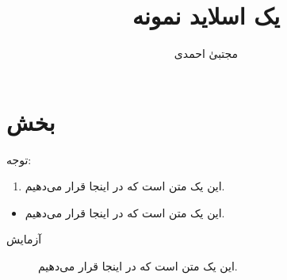 \documentclass{beamer}
\title{یک اسلاید نمونه}
\author{مجتبیٰ احمدی}
\begin{document}
\section{بخش}
\begin{frame}
توجه:
\begin{enumerate}
\item 
این یک متن است که در اینجا قرار می‌دهیم.
\end{enumerate}
\begin{itemize}
\item 
این یک متن است که در اینجا قرار می‌دهیم.
\end{itemize}
\begin{description}
\item[آزمایش]
این یک متن است که در اینجا قرار می‌دهیم.
\end{description}

\end{frame}
\end{document}
